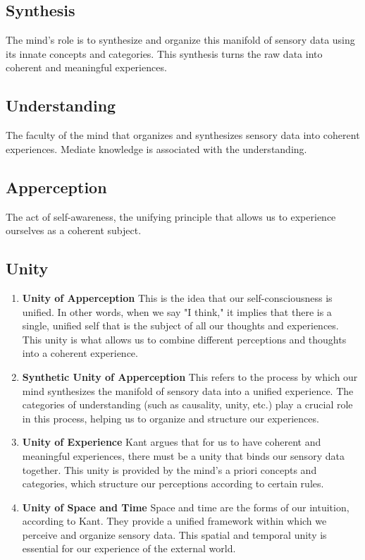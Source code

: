 \documentclass[a4paper]{article}
\begin{document}
\subsection{Synthesis}
The mind's role is to synthesize and organize this manifold of sensory data using its innate concepts and categories. 
This synthesis turns the raw data into coherent and meaningful experiences.

\subsection{Understanding}
The faculty of the mind that organizes and synthesizes sensory data into coherent experiences.
Mediate knowledge is associated with the understanding.

\subsection{Apperception}
The act of self-awareness, the unifying principle that allows us to experience ourselves as a coherent subject.

\subsection{Unity}

\begin{enumerate}
    \item \textbf{Unity of Apperception} This is the idea that our self-consciousness is unified. 
    In other words, when we say "I think," it implies that there is a single, unified self that is the subject of all our thoughts and experiences. 
    This unity is what allows us to combine different perceptions and thoughts into a coherent experience.
    \item \textbf{Synthetic Unity of Apperception} This refers to the process by which our mind synthesizes the manifold of sensory data into a unified experience. 
    The categories of understanding (such as causality, unity, etc.) play a crucial role in this process, helping us to organize and structure our experiences.
    \item \textbf{Unity of Experience} Kant argues that for us to have coherent and meaningful experiences, there must be a unity that binds our sensory data together. 
    This unity is provided by the mind's a priori concepts and categories, which structure our perceptions according to certain rules.
    \item \textbf{Unity of Space and Time} Space and time are the forms of our intuition, according to Kant. 
    They provide a unified framework within which we perceive and organize sensory data. 
    This spatial and temporal unity is essential for our experience of the external world.
\end{enumerate}
\end{document}
